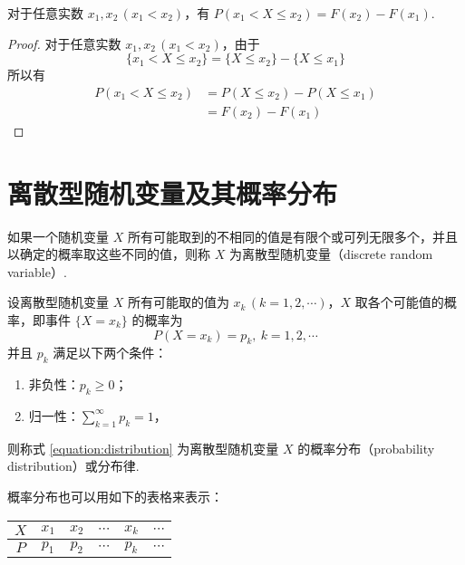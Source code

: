 \begin{property}
    \indent 对于任意实数 $x_1,x_2\, (x_1<x_2)$，有 $P(x_1 < X \leqslant x_2)=F(x_2)-F(x_1)$.
\end{property}

\begin{proof}
    对于任意实数 $x_1,x_2\, (x_1<x_2)$，由于
    $$
    \{x_1 < X \leqslant x_2\} = \{X \leqslant x_2\} - \{X \leqslant x_1\}
    $$
    所以有
    $$
    \begin{aligned}
        P(x_1 < X \leqslant x_2) &= P(X \leqslant x_2) - P(X \leqslant x_1) \\
        &= F(x_2)-F(x_1)
    \end{aligned}
    $$
\end{proof}

\section{离散型随机变量及其概率分布}

\begin{definition}
    \indent 如果一个随机变量 $X$ 所有可能取到的不相同的值是有限个或可列无限多个，并且以确定的概率取这些不同的值，则称 $X$ 为{\heiti 离散型随机变量}（discrete random variable）.
\end{definition}

\begin{definition}
    \indent 设离散型随机变量 $X$ 所有可能取的值为 $x_k\, (k=1,2,\cdots)$，$X$ 取各个可能值的概率，即事件 $\{X=x_k\}$ 的概率为
    \begin{equation} \label{equation:distribution}
        P(X=x_k) = p_k, \ k=1,2,\cdots
    \end{equation}
    并且 $p_k$ 满足以下两个条件：
    \begin{enumerate}
        \item 非负性：$p_k \geqslant 0$；\vspace{0.5em}
        \item 归一性：$\displaystyle\sum_{k=1}^\infty p_k = 1$，
    \end{enumerate} \vspace{0.5em}
    则称式 \eqref{equation:distribution} 为离散型随机变量 $X$ 的{\heiti 概率分布}（probability distribution）或{\heiti 分布律}.
\end{definition}

概率分布也可以用如下的表格来表示：
\begin{table*}[htbp]
    \centering

    \begin{tabular}{c | c c c c c}
        \hline
        $X$ & $x_1$ & $x_2$ & $\cdots$ & $x_k$ & $\cdots$ \\
        \hline
        $P$ & $p_1$ & $p_2$ & $\cdots$ & $p_k$ & $\cdots$ \\
        \hline
    \end{tabular}
\end{table*}

